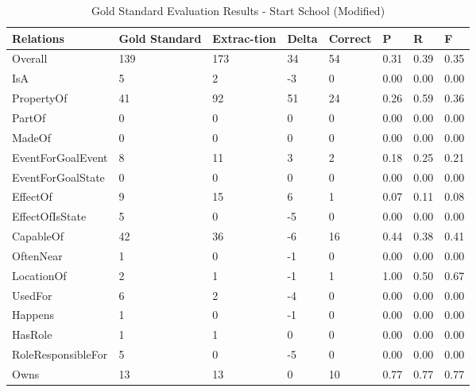 \begin{table}[H]   %
\centering
\caption{Gold Standard Evaluation Results - Start School (Modified)} \vspace{0.25em}
\begin{tabular}{|p{3.5cm}|p{2cm}|p{1.5cm}|p{1cm}|p{1.5cm}|p{1cm}|p{1cm}|p{1cm}|} \hline
\textbf{Relations} & \textbf{Gold Standard} & \textbf{Extrac-tion} & \textbf{Delta} & \textbf{Correct} & \textbf{P} & \textbf{R} & \textbf{F} \\ \hline
Overall & 139 & 173 & 34 & 54 & 0.31 & 0.39 & 0.35 \\ \hline
IsA & 5 & 2 & -3 & 0 & 0.00 & 0.00 & 0.00 \\ \hline
PropertyOf & 41 & 92 & 51 & 24 & 0.26 & 0.59 & 0.36 \\ \hline
PartOf  & 0 & 0 & 0 & 0 & 0.00 & 0.00 & 0.00 \\ \hline
MadeOf & 0 & 0 & 0 & 0 & 0.00 & 0.00 & 0.00 \\ \hline
EventForGoalEvent & 8 & 11 & 3 & 2 & 0.18 & 0.25 & 0.21 \\ \hline
EventForGoalState & 0 & 0 & 0 & 0 & 0.00 & 0.00 & 0.00 \\ \hline
EffectOf & 9 & 15 & 6 & 1 & 0.07 & 0.11 & 0.08 \\ \hline
EffectOfIsState & 5 & 0 & -5 & 0 & 0.00 & 0.00 & 0.00 \\ \hline
CapableOf & 42 & 36 & -6 & 16 & 0.44 & 0.38 & 0.41 \\ \hline
OftenNear & 1 & 0 & -1 & 0 & 0.00 & 0.00 & 0.00 \\ \hline
LocationOf & 2 & 1 & -1 & 1 & 1.00 & 0.50 & 0.67 \\ \hline
UsedFor & 6 & 2 & -4 & 0 & 0.00 & 0.00 & 0.00 \\ \hline
Happens & 1 & 0 & -1 & 0 & 0.00 & 0.00 & 0.00 \\ \hline
HasRole & 1 & 1 & 0 & 0 & 0.00 & 0.00 & 0.00 \\ \hline
RoleResponsibleFor & 5 & 0 & -5 & 0 & 0.00 & 0.00 & 0.00 \\ \hline
Owns & 13 & 13 & 0 & 10 & 0.77 & 0.77 & 0.77 \\ \hline
\end{tabular}
\label{tab:gold3}
\end{table}

